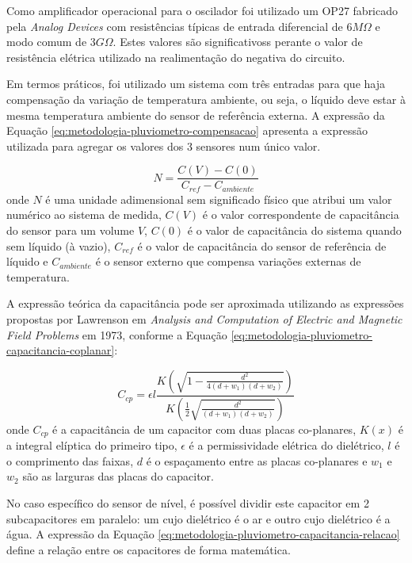 \documentclass[a4paper]{instrumentacao}
\begin{document}
Como amplificador operacional para o oscilador foi utilizado um OP27 fabricado pela \textit{Analog Devices} com resistências típicas de entrada diferencial de $6 M\Omega$ e modo comum de $3 G\Omega$. Estes valores são significativoss perante o valor de resistência elétrica utilizado na realimentação do negativa do circuito.

Em termos práticos, foi utilizado um sistema com três entradas para que haja compensação da variação de temperatura ambiente, ou seja, o líquido deve estar à mesma temperatura ambiente do sensor de referência externa. A expressão da Equação \ref{eq:metodologia-pluviometro-compensacao} apresenta a expressão utilizada para agregar os valores dos 3 sensores num único valor.

\begin{equation}
	N = \frac{C(V) - C(0)}{C_{ref} - C_{ambiente}}
	\label{eq:metodologia-pluviometro-compensacao}
\end{equation}
\noindent onde $N$ é uma unidade adimensional sem significado físico que atribui um valor numérico ao sistema de medida, $C(V)$ é o valor correspondente de capacitância do sensor para um volume $V$, $C(0)$ é o valor de capacitância do sistema quando sem líquido (à vazio), $C_{ref}$ é o valor de capacitância do sensor de referência de líquido e $C_{ambiente}$ é o sensor externo que compensa variações externas de temperatura.

A expressão teórica da capacitância pode ser aproximada utilizando as expressões propostas por Lawrenson em \textit{Analysis and Computation of Electric and Magnetic Field Problems}\cite{capacitor-plano} em 1973, conforme a Equação \ref{eq:metodologia-pluviometro-capacitancia-coplanar}:

\begin{equation}
	C_{cp} = \epsilon l \frac{K\left(\sqrt{1-\frac{d^2}{4 (d+w_1) (d+w_2)}}\right)}{K\left(\frac{1}{2} \sqrt{\frac{d^2}{(d+w_1) (d+w_2)}}\right)}
	\label{eq:metodologia-pluviometro-capacitancia-coplanar}
\end{equation}
\noindent onde $C_{cp}$ é a capacitância de um capacitor com duas placas co-planares, $K(x)$ é a integral elíptica do primeiro tipo, $\epsilon$ é a permissividade elétrica do dielétrico, $l$ é o comprimento das faixas, $d$ é o espaçamento entre as placas co-planares e $w_1$ e $w_2$ são as larguras das placas do capacitor.

No caso específico do sensor de nível, é possível dividir este capacitor em 2 subcapacitores em paralelo: um cujo dielétrico é o ar e outro cujo dielétrico é a água. A expressão da Equação \ref{eq:metodologia-pluviometro-capacitancia-relacao} define a relação entre os capacitores de forma matemática.
\end{document}
